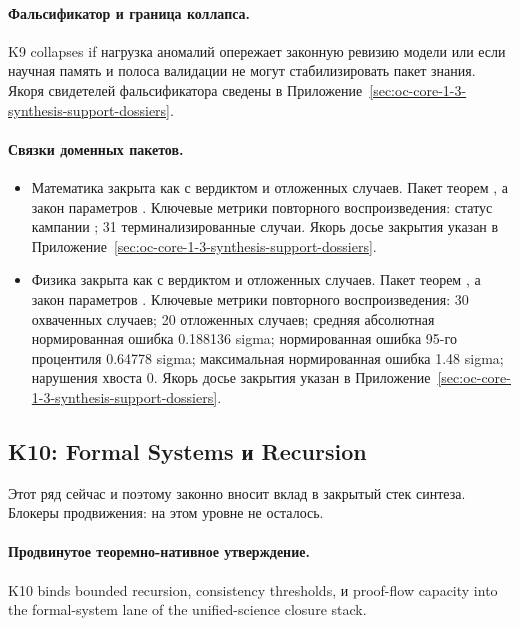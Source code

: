 \paragraph{Фальсификатор и граница коллапса.}
K9 collapses if нагрузка аномалий опережает законную ревизию модели или если научная память и полоса валидации не могут стабилизировать пакет знания.
Якоря свидетелей фальсификатора сведены в Приложение~\ref{sec:oc-core-1-3-synthesis-support-dossiers}.

\paragraph{Связки доменных пакетов.}
\begin{itemize}[leftmargin=1.6em,nosep]
\item Математика закрыта как  с вердиктом  и  отложенных случаев. Пакет теорем , а закон параметров . Ключевые метрики повторного воспроизведения: статус кампании ; 31 терминализированные случаи. Якорь досье закрытия указан в Приложение~\ref{sec:oc-core-1-3-synthesis-support-dossiers}.
\item Физика закрыта как  с вердиктом  и  отложенных случаев. Пакет теорем , а закон параметров . Ключевые метрики повторного воспроизведения: 30 охваченных случаев; 20 отложенных случаев; средняя абсолютная нормированная ошибка 0.188136 sigma; нормированная ошибка 95-го процентиля 0.64778 sigma; максимальная нормированная ошибка 1.48 sigma; нарушения хвоста 0. Якорь досье закрытия указан в Приложение~\ref{sec:oc-core-1-3-synthesis-support-dossiers}.
\end{itemize}

\subsection{K10: Formal Systems и Recursion}
\label{sec:oc-core-1-3-synthesis-k10}
Этот ряд сейчас  и поэтому законно вносит вклад в закрытый стек синтеза.
Блокеры продвижения: на этом уровне не осталось.

\paragraph{Продвинутое теоремно-нативное утверждение.}
K10 binds bounded recursion, consistency thresholds, и proof-flow capacity into the formal-system lane of the unified-science closure stack.

